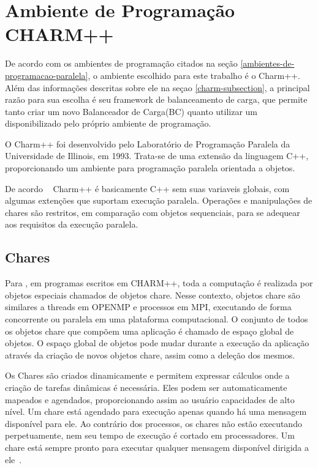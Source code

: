 \section{Ambiente de Programação CHARM++}

\label{charm}
De acordo com os ambientes de programação citados na seção \ref{ambientes-de-programacao-paralela}, o ambiente escolhido para este trabalho é o Charm++. Além das informações descritas sobre ele na seçao \ref{charm-subsection}, a principal razão para sua escolha é  seu framework de balanceamento de carga, que permite tanto criar um novo Balanceador de Carga(BC) quanto utilizar um disponibilizado pelo próprio ambiente de programação.

O Charm++ foi desenvolvido pelo Laboratório de Programação Paralela da Universidade de Illinois, em 1993. Trata-se de uma extensão da linguagem C++, proporcionando um ambiente para programação paralela orientada a objetos. 

De acordo ~\cite{kale1993charm++} Charm++ é basicamente C++ sem suas variaveis globais, com algumas extenções que suportam execução paralela. Operações e manipulações de chares são restritos, em comparação com objetos sequenciais, para se adequear aos requisitos da execução paralela.

\subsection{Chares}
\label{chares}
Para \cite[p.27]{pilla2015programaccao2}, em programas escritos em CHARM++, toda a computação é realizada por objetos especiais chamados de objetos chare. Nesse contexto, objetos chare são similares a threads em OPENMP e processos em MPI, executando de forma concorrente ou paralela em uma plataforma computacional. O conjunto de todos os objetos chare que compõem uma aplicação é chamado de espaço global de objetos. O espaço global de objetos pode mudar durante a execução da aplicação através da criação de novos objetos chare, assim como a deleção dos mesmos.

Os Chares são criados dinamicamente e permitem expressar cálculos onde a criação de tarefas dinâmicas é necessária. Eles podem ser automaticamente mapeados e agendados, proporcionando assim ao usuário capacidades de alto nível. Um chare está agendado para execução apenas quando há uma mensagem disponível para ele. Ao contrário dos processos, os chares não estão executando perpetuamente, nem seu tempo de execução é cortado em processadores. Um chare está sempre pronto para executar qualquer mensagem disponível dirigida a ele~\cite[p.3]{Kale95thecharm}. 

